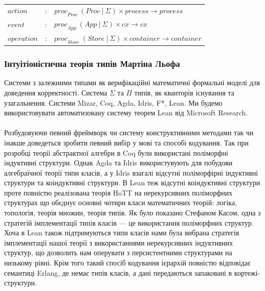 \documentclass[11pt,oneside]{article}
\begin{document}
\begin{center}
\begin{tabular}{lll}
         $action$ &:& ${proc}_{Proc}\ (Proc\ |\ \Sigma) \times process \rightarrow process$ \\
         $event$  &:& ${proc}_{App}\ (App\ |\ \Sigma) \times cx \rightarrow cx$ \\
         $operation$    &:& ${proc}_{Store}\ (Store\ |\ \Sigma) \times container \rightarrow container$ \\
\end{tabular}
\end{center}

\newpage
   \subsubsection{Інтуітіоністична теорія типів Мартіна Льофа}
   Системи з залежними типами як верифікаційні математичні формальні моделі
   для доведення корректності. Система $\Sigma$ та $\Pi$ типів, як кванторів
   існування та узагальнення. Системи Mizar, Coq, Agda, Idris, F*, Lean. Ми будемо
   використовувати автоматизовану систему теорем Lean від Microsoft Research.
   \paragraph{}
   Розбудовуючи певний фреймворк чи систему конструктивними методами
   так чи інакше доведеться зробити певний вибір у мові та способі кодування.
   Так при розробці теорії абстрактної алгебри в Coq були використані
   поліморфні індуктивні структури\cite{coqalg}. Однак Agda та Idris використувують
   для побудови алгебраїчної теорії типи класів, а у Idris взагалі відсутні
   поліморфірні індуктивні структури та коіндуктивні структури. В Lean
   теж відсутні коіндуктивні структури проте повністю реалізована теорія
   HoTT на нерекурсивних поліморфних структурах що обєднує основні чотири
   класи математичних теорій: логіка, топологія, теорія множин, теорія типів.
   Як було показано Стефаном Касом\cite{kaes}, одна з
   стратегій імплементації типів класів --- це використання поліморфних структур.
   Хоча в Lean також підтримуються типи класів нами була вибрана стратегія
   імплементації нашої теорії з використаннями нерекурсивних індуктивних структур,
   що дозволить нам оперувати з персистентними структурами на низькому рівні.
   Крім того такий спосіб кодування ієрархій повністю відповідає семантиці Erlang,
   де немає типів класів, а дані передаються запаковані в кортежі-структури.
\end{document}
